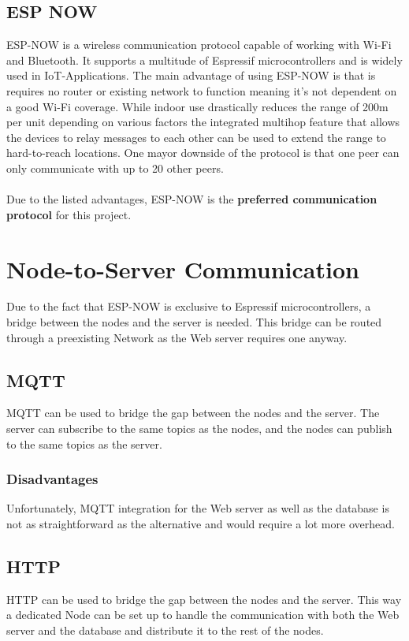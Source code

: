     \subsection{ESP NOW} 
    ESP-NOW is a wireless communication protocol capable of
    working with Wi-Fi and Bluetooth. It supports a 
    multitude of Espressif microcontrollers and is widely 
    used in IoT-Applications. The main advantage of using
    ESP-NOW is that is requires no router or existing
    network to function meaning it's not dependent on
    a good Wi-Fi coverage. While indoor use drastically
    reduces the range of 200m per unit depending on various
    factors \cite{esp-now-reach_2024} 
    the integrated multihop feature that allows the devices 
    to relay messages to each other can be used to extend 
    the range to hard-to-reach locations. One mayor downside
    of the protocol is that one peer can only communicate with
    up to 20 other peers.
    \\~\\
    Due to the listed advantages, ESP-NOW is the \textbf{preferred
    communication protocol} for this project.


\section{Node-to-Server Communication}
Due to the fact that ESP-NOW is exclusive to Espressif microcontrollers,
a bridge between the nodes and the server is needed. This bridge can be 
routed through a preexisting Network as the Web server requires 
one anyway.


    \subsection{MQTT}
    MQTT can be used to bridge the gap between the nodes and the server.
    The server can subscribe to the same topics as the nodes, and the nodes
    can publish to the same topics as the server.

        \subsubsection{Disadvantages}
        Unfortunately, MQTT integration for the Web server as well as the database
        is not as straightforward as the alternative and would require a lot more 
        overhead.

    \subsection{HTTP}
    HTTP can be used to bridge the gap between the nodes and the server.
    This way a dedicated Node can be set up to handle the communication
    with both the Web server and the database and distribute it to the 
    rest of the nodes.

